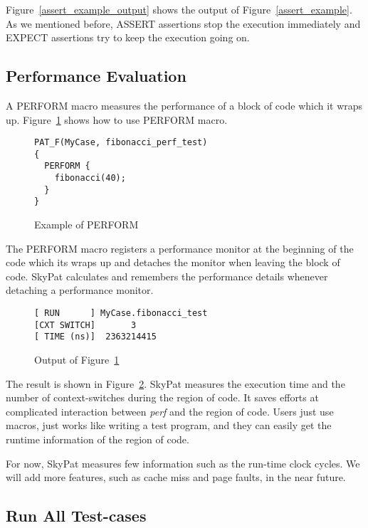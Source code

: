 \documentclass[final]{ols}
\begin{document}
Figure~\ref{assert_example_output} shows the output of Figure~\ref{assert_example}.
As we mentioned before, ASSERT assertions stop the execution immediately and EXPECT assertions try to keep the execution going on.

\subsection{Performance Evaluation}

A PERFORM macro measures the performance of a block of code which it wraps up.
Figure~\ref{perform_example} shows how to use PERFORM macro.

\begin{figure}[h]
\lstset{language=C++}
\begin{lstlisting}[frame=single]
PAT_F(MyCase, fibonacci_perf_test)
{
  PERFORM {
    fibonacci(40);
  }
}
\end{lstlisting}
\caption{Example of PERFORM}
\label{perform_example}
\end{figure}

The PERFORM macro registers a performance monitor at the beginning of the code which its wraps up and detaches the monitor when leaving the block of code.
SkyPat calculates and remembers the performance details whenever detaching a performance monitor.

\begin{figure}[h]
\lstset{language=sh}
\begin{lstlisting}[frame=single]
[ RUN      ] MyCase.fibonacci_test
[CXT SWITCH]       3
[ TIME (ns)]  2363214415
\end{lstlisting}
\caption{Output of Figure~\ref{perform_example}}
\label{perform_example_output}
\end{figure}

The result is shown in Figure~\ref{perform_example_output}.
SkyPat measures the execution time and the number of context-switches during the region of code.
It saves efforts at complicated interaction between \textit{perf} and the region of code.
Users just use macros, just works like writing a test program, and they can easily get the runtime information of the region of code.

For now, SkyPat measures few information such as the run-time clock cycles.
We will add more features, such as cache miss and page faults, in the near future.

\subsection{Run All Test-cases}
\end{document}
